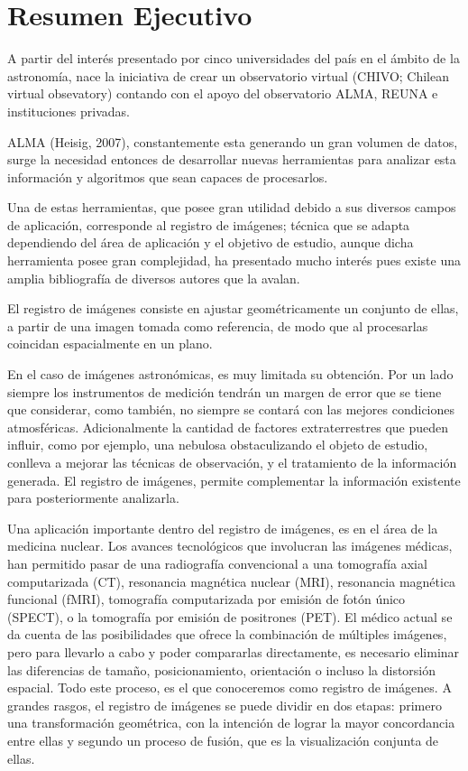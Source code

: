 \section{Resumen Ejecutivo}

A partir del interés presentado por cinco universidades del país en el
ámbito de la astronomía, nace la iniciativa de crear un observatorio
virtual (CHIVO; Chilean virtual obsevatory) contando con el apoyo del
observatorio ALMA, REUNA e instituciones privadas.

ALMA (Heisig, 2007), constantemente esta generando un gran volumen de
datos, surge la necesidad entonces de desarrollar nuevas herramientas
para analizar esta información y algoritmos que sean capaces de
procesarlos.

Una de estas herramientas, que posee gran utilidad debido a sus
diversos campos de aplicación, corresponde al registro de imágenes;
técnica que se adapta dependiendo del área de aplicación y el objetivo
de estudio, aunque dicha herramienta posee gran complejidad, ha
presentado mucho interés pues existe una amplia bibliografía de
diversos autores que la avalan.

El registro de imágenes consiste en ajustar geométricamente un
conjunto de ellas, a partir de una imagen tomada como referencia, de
modo que al procesarlas coincidan espacialmente en un plano.

En el caso de imágenes astronómicas, es muy limitada su obtención. Por
un lado siempre los instrumentos de medición tendrán un margen de
error que se tiene que considerar, como también, no siempre se contará
con las mejores condiciones atmosféricas. Adicionalmente la cantidad
de factores extraterrestres que pueden influir, como por ejemplo, una
nebulosa obstaculizando el objeto de estudio, conlleva a mejorar las
técnicas de observación, y el tratamiento de la información generada.
El registro de imágenes, permite complementar la información existente
para posteriormente analizarla.

Una aplicación importante dentro del registro de imágenes, es en el
área de la medicina nuclear. Los avances tecnológicos que involucran
las imágenes médicas, han permitido pasar de una radiografía
convencional a una tomografía axial computarizada (CT), resonancia
magnética nuclear (MRI), resonancia magnética funcional (fMRI),
tomografía computarizada por emisión de fotón único (SPECT), o la
tomografía por emisión de positrones (PET). El médico actual se da
cuenta de las posibilidades que ofrece la combinación de múltiples
imágenes, pero para llevarlo a cabo y poder compararlas directamente,
es necesario eliminar las diferencias de tamaño, posicionamiento,
orientación o incluso la distorsión espacial. Todo este proceso, es el
que conoceremos como registro de imágenes. A grandes rasgos, el
registro de imágenes se puede dividir en dos etapas: primero una
transformación geométrica, con la intención de lograr la mayor
concordancia entre ellas y segundo un proceso de fusión, que es la
visualización conjunta de ellas.

